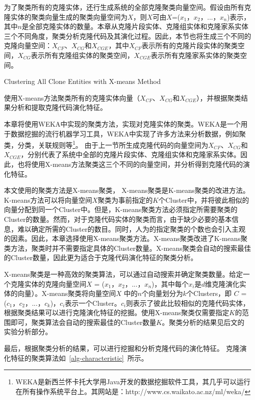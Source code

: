 为了聚类所有的克隆实体，还行生成系统的全部克隆聚类向量空间。假设由所有克隆实体的聚类向量生成的聚类向量空间为$X$，则$X$可由{$X$={($x_1$，$x_2$，$...$，$x_n$)}}表示，其中$n$是全部克隆实体的数量。本章从克隆片段实体、克隆组实体和克隆家系实体三个不同角度，聚类分析克隆代码及其演化过程。因此，本节也将生成三个不同的克隆向量空间：$X_{CF}$、$X_{CG}$和$X_{CGE}$，其中$X_{CF}$表示所有的克隆片段实体的聚类空间，$X_{CG}$表示所有克隆组实体的聚类空间，$X_{CGE}$表示所有克隆家系实体的聚类空间。

{Clustering All Clone Entities with X-means Method}

使用X-means方法聚类所有的克隆实体向量（$X_{CF}$、$X_{CG}$和$X_{CGE}$），并根据聚类结果分析和提取克隆代码演化特征。

本章将使用WEKA中实现的聚类方法，实现对克隆实体的聚类。WEKA是一个用于数据挖掘的流行机器学习工具，WEKA中实现了许多方法来分析数据，例如聚类，分类，关联规则等\footnote{WEKA是新西兰怀卡托大学用Java开发的数据挖掘软件工具，其几乎可以运行在所有操作系统平台上。其网站是：http://www.cs.waikato.ac.nz/ml/weka/}。 由于上一节所生成克隆代码的向量空间为$X_{CF}$、$X_{CG}$和$X_{CGE}$，分别代表了系统中全部的克隆片段实体、克隆组实体和克隆家系实体。因此，也将使用X-means方法聚类这三个不同的向量空间，并分析得到克隆代码的演化特征。

本文使用的聚类方法是X-means聚类\cite{pelleg2000x}， X-means聚类是K-means聚类\cite{arthur2007k}的改进方法。K-means方法可以将向量空间$X$聚类为事前指定的$K$个Cluster中，并将彼此相似的向量分配到同一个Cluster中。但是，K-means聚类方法必须指定所需要聚类的Cluster的数量。然而，对于克隆代码实体的聚类而言，由于缺少必要的基本信息，难以确定所需的Cluster的数目。同时，人为的指定聚类的个数也会引入主观的因素。因此，本章选择使用X-means聚类方法。X-means聚类改进了K-means聚类方法，聚类时并不需要指定具体的Cluster数量。X-means聚类会自动的搜索最佳的Cluster数量，因此更为适合于克隆代码演化特征的聚类分析。

X-means聚类是一种高效的聚类算法，可以通过自动搜索并确定聚类数量\cite{pelleg2000x}。给定一个克隆实体的克隆向量空间$X$ = {($x_1$，$x_2$，$...$，$x_n$)}，其中每个$x_i$是$d$维克隆演化实体的向量）。X-means聚类将向量空间$X$ 中的$n$个向量划分为$k$个Clusters，即 $C$ = {($c_1$，$c_2$，$...$，$c_k$)}，$c_i$表示一个Cluster。$c_i$则表示了彼此比较相似的克隆代码实体，根据聚类结果可以进行克隆演化特征的挖掘。使用X-means聚类仅需要指定$K$的范围即可，聚类算法会自动的搜索最佳的Cluster数量$K$。聚类分析的结果见后文的实验分析部分。

最后，根据聚类分析的结果，可以进行挖掘和分析克隆代码的演化特征。
克隆演化特征的聚类算法如~\ref{alg-characteristic}~所示。

